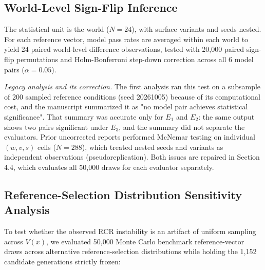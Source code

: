 \documentclass[11pt]{article}
\begin{document}
\subsection{World-Level Sign-Flip Inference}
The statistical unit is the world ($N=24$), with surface variants and seeds nested. For each reference vector, model pass rates are averaged within each world to yield 24 paired world-level difference observations, tested with 20,000 paired sign-flip permutations and Holm-Bonferroni step-down correction across all 6 model pairs ($\alpha = 0.05$).

\emph{Legacy analysis and its correction.} The first analysis ran this test on a subsample of 200 sampled reference conditions (seed 20261005) because of its computational cost, and the manuscript summarized it as "no model pair achieves statistical significance". That summary was accurate only for $E_1$ and $E_2$: the same output shows two pairs significant under $E_3$, and the summary did not separate the evaluators. Prior uncorrected reports performed McNemar testing on individual $(w, v, s)$ cells ($N=288$), which treated nested seeds and variants as independent observations (pseudoreplication). Both issues are repaired in Section 4.4, which evaluates all 50,000 draws for each evaluator separately.

\subsection{Reference-Selection Distribution Sensitivity Analysis}
To test whether the observed RCR instability is an artifact of uniform sampling across $V(x)$, we evaluated 50,000 Monte Carlo benchmark reference-vector draws across alternative reference-selection distributions while holding the 1,152 candidate generations strictly frozen:
\end{document}
